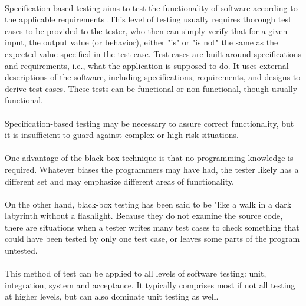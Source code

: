 \documentclass[11pt,a4paper]{report}
\begin{document}
\paragraph{}Specification-based testing aims to test the functionality of software according to the applicable requirements .This level of testing usually requires thorough test cases to be provided to the tester, who then can simply verify that for a given input, the output value (or behavior), either "is" or "is not" the same as the expected value specified in the test case. Test cases are built around specifications and requirements, i.e., what the application is supposed to do. It uses external descriptions of the software, including specifications, requirements, and designs to derive test cases. These tests can be functional or non-functional, though usually functional.\\
\paragraph{}Specification-based testing may be necessary to assure correct functionality, but it is insufficient to guard against complex or high-risk situations.\\
\paragraph{}One advantage of the black box technique is that no programming knowledge is required. Whatever biases the programmers may have had, the tester likely has a different set and may emphasize different areas of functionality.\\
\paragraph{}On the other hand, black-box testing has been said to be "like a walk in a dark labyrinth without a flashlight. Because they do not examine the source code, there are situations when a tester writes many test cases to check something that could have been tested by only one test case, or leaves some parts of the program untested.\\
\paragraph{}This method of test can be applied to all levels of software testing: unit, integration, system and acceptance. It typically comprises most if not all testing at higher levels, but can also dominate unit testing as well.\\
\end{document}
